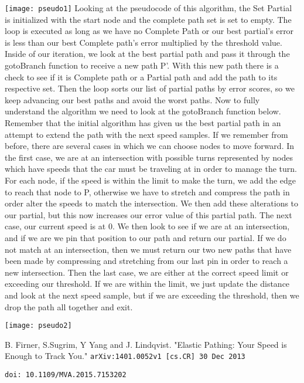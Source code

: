 \documentclass[11pt]{article}
\begin{document}
\texttt{[image: pseudo1]}
\newline
Looking at the pseudocode of this algorithm, the Set Partial is initialized with the start node and the complete path set is set to empty. The loop is executed as long as we have no Complete Path or our best partial's error is less than our best Complete path's error multiplied by the threshold value. Inside of our iteration, we look at the best partial path and pass it through the gotoBranch function to receive a new path P'. With this new path there is a check to see if it is Complete path or a Partial path and add the path to its respective set. Then the loop sorts our list of partial paths by error scores, so we keep advancing our best paths and avoid the worst paths. 
\newline
\newline
Now to fully understand the algorithm we need to look at the gotoBranch function below. Remember that the initial algorithm has given us the best partial path in an attempt to extend the path with the next speed samples. If we remember from before, there are several cases in which we can choose nodes to move forward. 
In the first case, we are at an intersection with possible turns represented by nodes which have speeds that the car must be traveling at in order to manage the turn. For each node, if the speed is within the limit to make the turn, we add the edge to reach that node to P, otherwise we have to stretch and compress the path in order alter the speeds to match the intersection. We then add these alterations to our partial, but this now increases our error value of this partial path. 
The next case, our current speed is at 0. We then look to see if we are at an intersection, and if we are we pin that position to our path and return our partial. If we do not match at an intersection, then we must return our two new paths that have been made by compressing and stretching from our last pin in order to reach a new intersection. 
Then the last case, we are either at the correct speed limit or exceeding our threshold. If we are within the limit, we just update the distance and look at the next speed sample, but if we are exceeding the threshold, then we drop the path all together and exit. 

\texttt{[image: pseudo2]}
\newline

\begin{thebibliography}{10}

  B. Firner, S.Sugrim, Y Yang and J. Lindqvist. "Elastic Pathing: Your Speed is Enough to Track You." {\tt arXiv:1401.0052v1 [cs.CR] 30 Dec 2013}

{\tt doi: 10.1109/MVA.2015.7153202}


\end{thebibliography}
\end{document}
